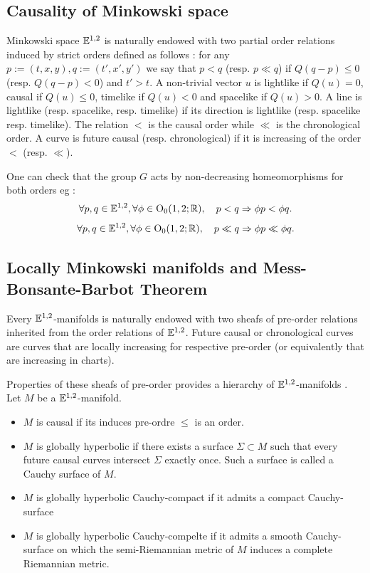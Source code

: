 \subsection{Causality of Minkowski space}\label{sec:mink_caus}


Minkowski space $\mathbb{E}^{1,2}$ is naturally endowed with two partial order relations induced by strict orders defined as follows : for any $p:=(t,x,y), q:=(t',x',y')$  we say that 
$p<q$ (resp. $p\ll q $) if $Q(q-p)\leq 0$ (resp. $Q(q-p)<0$) and $t'>t$. 
A non-trivial vector $u$ is lightlike if $Q(u)=0$, causal if $Q(u)\leq 0$, timelike if $Q(u)<0$ and spacelike if $Q(u)>0$. A line is lightlike (resp. spacelike, resp. timelike) if its direction is lightlike (resp. spacelike resp. timelike).
The relation $<$ is the causal order while $\ll$ is the chronological order. 
A curve is future causal  (resp. chronological) if it is increasing of the order $<$ (resp. $\ll$). 



One can check that the group $G$ acts by non-decreasing homeomorphisms for both orders eg : 
$$ \forall p,q \in \mathbb{E}^{1,2}, \forall \phi\in \mathrm{O}_{0}(1,2 ; \mathbb R),\quad 
 p< q \Rightarrow \phi p < \phi q.$$
$$ \forall p,q \in \mathbb{E}^{1,2}, \forall \phi\in \mathrm{O}_{0}(1,2 ; \mathbb R),\quad 
 p\ll q \Rightarrow \phi p \ll \phi q.$$

 \subsection{Locally Minkowski manifolds and Mess-Bonsante-Barbot Theorem}
\label{sec:mess}
Every $\mathbb{E}^{1,2}$-manifolds is naturally endowed with two sheafs of pre-order relations inherited from the order relations of $\mathbb{E}^{1,2}$.  
Future causal or chronological curves are curves that are locally increasing for respective pre-order (or equivalently that are increasing in charts).

Properties of these sheafs of pre-order provides a hierarchy of $\mathbb{E}^{1,2}$-manifolds \cite{MR2196783}. 
 Let $M$ be a $\mathbb{E}^{1,2}$-manifold. 
 \begin{itemize}
  \item 
 $M$ is causal if its induces pre-ordre $\leq$ is an order. 
 
 \item $M$ is globally hyperbolic if  there exists a surface $\Sigma\subset M$ such that every future causal curves intersect $\Sigma$ exactly once. Such a surface is called a Cauchy surface of $M$.

 
 \item $M$ is globally hyperbolic Cauchy-compact if it admits a compact Cauchy-surface
 \item $M$ is globally hyperbolic Cauchy-compelte if it admits a smooth Cauchy-surface on which the semi-Riemannian metric of $M$ induces a complete Riemannian metric. 
 \end{itemize}

